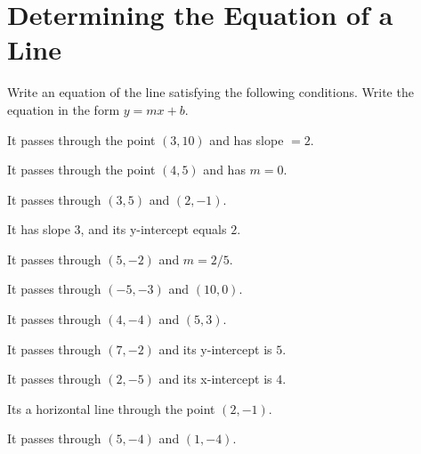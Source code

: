 \section{Determining the Equation of a Line}

Write an equation of the line satisfying the following conditions. Write the equation in the form $y = mx + b$.

\begin{puzzle}
    It passes through the point $(3, 10)$ and has slope $= 2$.
\end{puzzle}

\begin{puzzle}
    It passes through the point $(4,5)$ and has $m = 0$.
\end{puzzle}

\begin{puzzle}
    It passes through $(3, 5)$ and $(2, -1)$.
\end{puzzle}

\begin{puzzle}
    It has slope $3$, and its y-intercept equals $2$.
\end{puzzle}

\begin{puzzle}
    It passes through $(5, -2)$ and $m = 2/5$.
\end{puzzle}

\begin{puzzle}
    It passes through $(-5, -3)$ and $(10, 0)$.
\end{puzzle}

\begin{puzzle}
    It passes through $(4, -4)$ and $(5, 3)$.
\end{puzzle}

\begin{puzzle}
    It passes through $(7, -2)$ and its y-intercept is $5$.
\end{puzzle}

\begin{puzzle}
    It passes through $(2, -5)$ and its x-intercept is $4$.
\end{puzzle}

\begin{puzzle}
    Its a horizontal line through the point $(2, -1)$.
\end{puzzle}

\begin{puzzle}
    It passes through $(5, -4)$ and $(1, -4)$.
\end{puzzle}

